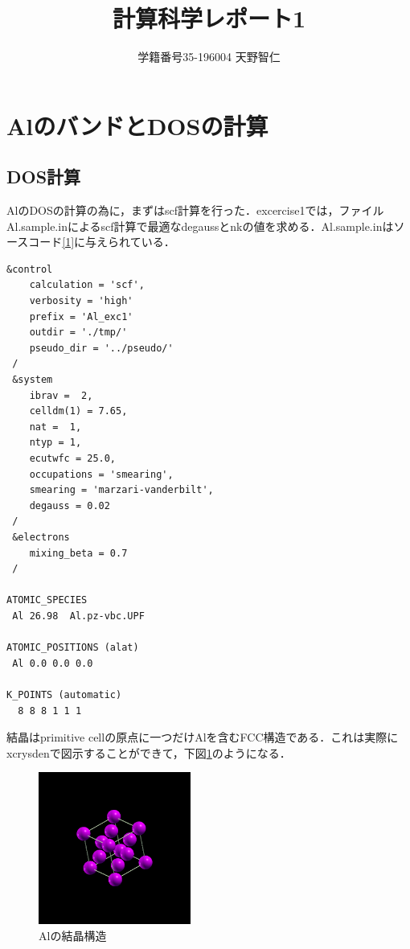\documentclass[a4j]{jarticle}
\title{計算科学レポート1}
\author{学籍番号35-196004 天野智仁 }
\date{}
\begin{document}
\maketitle
\section{AlのバンドとDOSの計算}
\subsection{DOS計算}
AlのDOSの計算の為に，まずはscf計算を行った．excercise1では，ファイルAl.sample.inによるscf計算で最適なdegaussとnkの値を求める．Al.sample.inはソースコード\ref{1}に与えられている．

\begin{lstlisting}[caption=Al.sample.in,label=1]
 &control
    calculation = 'scf',
    verbosity = 'high'
    prefix = 'Al_exc1'
    outdir = './tmp/'
    pseudo_dir = '../pseudo/'
 /
 &system
    ibrav =  2,
    celldm(1) = 7.65,
    nat =  1,
    ntyp = 1,
    ecutwfc = 25.0,
    occupations = 'smearing',
    smearing = 'marzari-vanderbilt',
    degauss = 0.02
 /
 &electrons
    mixing_beta = 0.7
 /

ATOMIC_SPECIES
 Al 26.98  Al.pz-vbc.UPF

ATOMIC_POSITIONS (alat)
 Al 0.0 0.0 0.0

K_POINTS (automatic)
  8 8 8 1 1 1 
\end{lstlisting}

結晶はprimitive cellの原点に一つだけAlを含むFCC構造である．これは実際にxcrysdenで図示することができて，下図\ref{040724_19May19}のようになる．
 \begin{figure}[htb]
  \begin{center}
   \includegraphics[width=5cm]{pwi2xsf.png}
   \caption{Alの結晶構造}
   \label{040724_19May19}
   \end{center}
 \end{figure}
\end{document}
